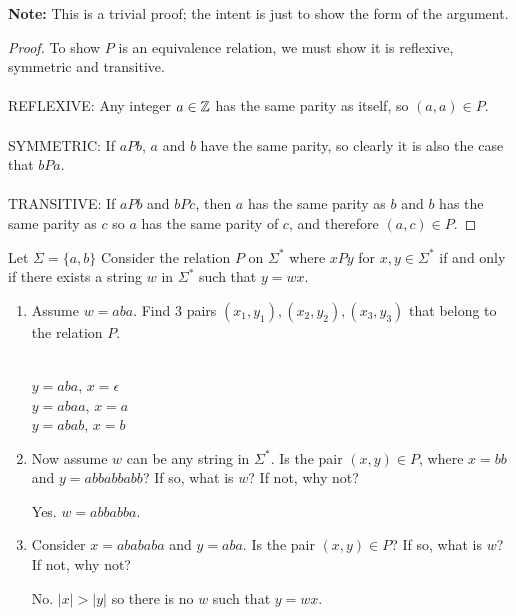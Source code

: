 \documentclass[]{exam}
\begin{document}
\begin{questions}
\begin{solution}
\textbf{Note:} This is a trivial proof; the intent is just to show the form of the
  argument.
\begin{proof}
To show $P$ is an equivalence relation, we must show it is reflexive, symmetric
and transitive.
\\~\\
REFLEXIVE: Any integer $a \in \mathbb{Z}$ has the same parity as itself, so $(a,a) \in
P$.
\\~\\
SYMMETRIC: If $aPb$, $a$ and $b$ have the same parity, so clearly it is also the
case that $bPa$.
\\~\\
TRANSITIVE: If $aPb$ and $bPc$, then $a$ has the same parity as $b$ and $b$ has
the same parity as $c$ so $a$ has the same parity of $c$, and therefore $(a,c)
\in P$. 
\end{proof}

\end{solution}

\question
Let $\Sigma = \{a,b\}$
Consider the relation $P$ on $\Sigma^*$ where $xPy$ for $x,y \in \Sigma^*$
if and only if there exists a string $w$ in $\Sigma^*$ such that $y = wx$. 
\begin{enumerate}[label=\alph*)]
\item Assume $w = aba$. Find $3$ pairs $(x_1,y_1),(x_2,y_2),(x_3,y_3)$ that belong
to the relation $P$.
\begin{solution}~\\
$y = aba$, $x = \epsilon$\\
$y = abaa$, $x = a$\\
$y = abab$, $x = b$\\
\end{solution}

\item Now assume $w$ can be any string in $\Sigma^*$. Is the pair $(x,y) \in P$,
where $x = bb$ and $y = abbabbabb$? If so, what is $w$? If not, why
not?
\begin{solution}
Yes. $w = abbabba$.
\end{solution}

\item Consider $x = abababa$ and $y = aba$. Is the pair $(x,y) \in P$? If so,
what is $w$? If not, why not?
\begin{solution}
No. $|x| > |y|$ so there is no $w$ such that $y = wx$.
\end{solution}


\end{enumerate}
\end{questions}
\end{document}
